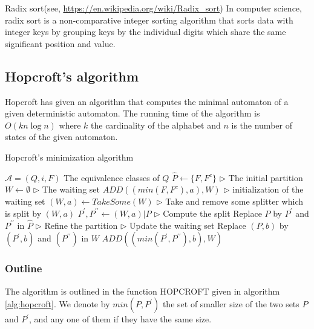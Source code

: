 Radix sort(see, \url{https://en.wikipedia.org/wiki/Radix_sort})
In computer science, radix sort is a non-comparative integer sorting algorithm that sorts data with integer keys by grouping keys by the individual digits which share the same significant position and value.

\subsection{Hopcroft's algorithm}

Hopcroft has given an algorithm that computes the minimal automaton of a given deterministic automaton. The running time of the algorithm is $O(k n \log n)$ where $k$ the cardinality of the alphabet and $n$ is the number of states of the given automaton.

\begin{algorithm}  
	\caption{Hopcroft's minimization algorithm}  \label{alg:hopcroft}
	\begin{algorithmic}[1] %
		\Require $\mathcal{A}=(Q,i,F)$  
		\Ensure The equivalence classes of $Q$  
		\State $\hat{P} \gets \{F,F^c \}$  \qquad\qquad $\triangleright$ The initial partition
		\State $W\gets \emptyset$  \qquad\qquad $\triangleright$ The waiting set
			\State $ADD((min(F,F^c),a),W)$ \qquad\qquad $\triangleright$ initialization of the waiting set
		\EndFor
			\State $(W,a)\gets TakeSome(W)$ \qquad\qquad $\triangleright$ Take and remove some splitter
			 which is split by $(W,a)$
				\State $P^{\prime},P^{\prime\prime}\gets (W,a)|P$ \qquad\qquad $\triangleright$ Compute the split
				\State Replace $P$ by $P^\prime$ and $P^{\prime\prime}$ in $\hat{P}$ \qquad\qquad $\triangleright$ Refine the partition
			\EndFor 
			  \qquad\qquad $\triangleright$ Update the waiting set
				  	\State Replace $(P,b)$ by $(P^\prime,b)$ and $(P^{\prime\prime})$ in $W$
				\Else
					\State $ADD((min(P^\prime,P^{\prime\prime}),b),W)$
				\EndIf  
			\EndFor
		\EndWhile
	\end{algorithmic}
\end{algorithm}

\subsubsection{Outline}

The algorithm is outlined in the function HOPCROFT given in algorithm \ref{alg:hopcroft}. We denote by $min(P, P^\prime)$ the set of smaller size of the two sets $P$ and $P^\prime$, and any one of them if they
have the same size.

